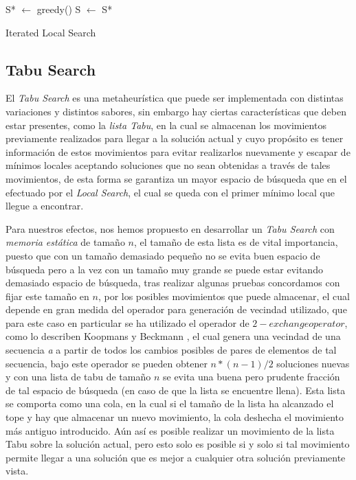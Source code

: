 \documentclass{ci5652}
\begin{document}
\begin{algorithm}
 \DontPrintSemicolon
 \vspace*{0.1cm}
 S* $\leftarrow$ greedy()\;
 S $\leftarrow$ S*\;
 
 \vspace*{0.1cm}
 \caption{Iterated Local Search}
\end{algorithm}

\subsection{Tabu Search}

El \textit{Tabu Search} es una metaheurística que puede ser implementada con distintas variaciones y distintos sabores, sin embargo hay ciertas características que deben estar presentes, como la \textit{lista Tabu}, en la cual se almacenan los movimientos previamente realizados para llegar a la solución actual y cuyo propósito es tener información de estos movimientos para evitar realizarlos nuevamente y escapar de mínimos locales aceptando soluciones que no sean obtenidas a través de tales movimientos, de esta forma se garantiza un mayor espacio de búsqueda que en el efectuado por el \textit{Local Search}, el cual se queda con el primer mínimo local que llegue a encontrar. 

Para nuestros efectos, nos hemos propuesto en desarrollar un \textit{Tabu Search} con \textit{memoria estática} de tamaño \(n\), el tamaño de esta lista es de vital importancia, puesto que con un tamaño demasiado pequeño no se evita buen espacio de búsqueda pero a la vez con un tamaño muy grande se puede estar evitando demasiado espacio de búsqueda, tras realizar algunas pruebas concordamos con fijar este tamaño en \(n\), por los posibles movimientos que puede almacenar, el cual depende en gran medida del operador para generación de vecindad utilizado, que para este caso en particular se ha utilizado el operador de \(2-exchange operator\), como lo describen Koopmans y Beckmann \cite{koopmans1957}, el cual genera una vecindad de una secuencia \textit{a} a partir de todos los cambios posibles de pares de elementos de tal secuencia, bajo este operador se pueden obtener \(n*(n-1)/2\) soluciones nuevas y con una lista de tabu de tamaño \(n\) se evita una buena pero prudente fracción de tal espacio de búsqueda (en caso de que la lista se encuentre llena). Esta lista se comporta como una cola, en la cual si el tamaño de la lista ha alcanzado el tope y hay que almacenar un nuevo movimiento, la cola deshecha el movimiento más antiguo introducido. Aún así es posible realizar un movimiento de la lista Tabu sobre la solución actual, pero esto solo es posible si y solo si tal movimiento permite llegar a una solución que es mejor a cualquier otra solución previamente vista.
\end{document}
